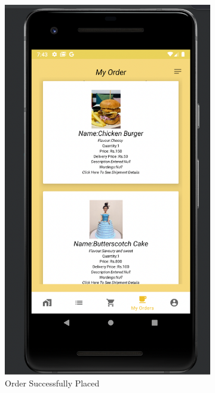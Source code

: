 \begin{figure}[H]
\begin{subfigure}[b]{0.3\textwidth}
         \includegraphics[width=\textwidth]{m3}
         \caption{Order Successfully Placed}
         \label{third disp}
     \end{subfigure}
     \hfill
     \\
     \vspace{20pt}
     \begin{subfigure}[b]{0.3\textwidth}
         \centering

\end{subfigure}
\end{figure}
